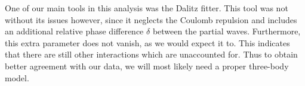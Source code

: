 One of our main tools in this analysis was the Dalitz fitter. This tool was not without its issues however, since it neglects the Coulomb repulsion and includes an additional relative phase difference $\delta$ between the partial waves. Furthermore, this extra parameter does not vanish, as we would expect it to. This indicates that there are still other interactions which are unaccounted for. Thus to obtain better agreement with our data, we will most likely need a proper three-body model.
